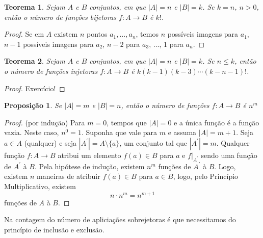 \documentclass[]{book}
\newtheorem{theorem}{Teorema}[chapter]
\newtheorem{proposition}{Proposição}[chapter]
\theoremstyle{definition}
\theoremstyle{definition}
\theoremstyle{definition}
\theoremstyle{remark}
\begin{document}
\begin{theorem}
\protect\hypertarget{thm:teoFuncoesBijetoras}{}{\label{thm:teoFuncoesBijetoras} }Sejam \(A\) e \(B\) conjuntos, em que \(|A|=n\) e \(|B|=k\).
Se \(k=n\), \(n>0\), então o número de funções bijetoras \(f:A\rightarrow B\) é \(k!\).
\end{theorem}

\begin{proof}
\iffalse{} {Prova. } \fi{}Se em \(A\) existem \(n\) pontos \(a_1, \ldots, a_n\), temos \(n\) possíveis imagens para \(a_1\), \(n-1\) possíveis imagens para \(a_2\), \(n-2\) para \(a_3\), \(\ldots\), 1 para \(a_n\).
\end{proof}

\begin{theorem}
\protect\hypertarget{thm:teoFuncoesInjetoras}{}{\label{thm:teoFuncoesInjetoras} }Sejam \(A\) e \(B\) conjuntos, em que \(|A|=n\) e \(|B|=k\).
Se \(n\leq k\), então o número de funções injetoras \(f:A\rightarrow B\) é \(k(k-1)(k-3)\cdots(k-n-1)!\).
\end{theorem}

\begin{proof}
\iffalse{} {Prova. } \fi{}Exercício!
\end{proof}

\begin{proposition}
\protect\hypertarget{prp:unnamed-chunk-85}{}{\label{prp:unnamed-chunk-85} }Se \(|A|=m\) e \(|B|=n\), então o número de funções \(f:A\rightarrow B\) é \(n^m\)
\end{proposition}

\begin{proof}
\iffalse{} {Prova. } \fi{}(por indução)
Para \(m=0\), tempos que \(|A|=0\) e a única função é a função vazia.
Neste caso, \(n^0=1\).
Suponha que vale para \(m\) e assuma \(|A|=m+1\).
Seja \(a \in A\) (qualquer) e seja \(|A^\prime|=A\setminus\{a\}\), um conjunto tal que \(|A^\prime|=m\).
Qualquer função \(f:A\rightarrow B\) atribui um elemento \(f(a)\in B\) para \(a\) e \(f|_{A^\prime}\) sendo uma função de \(A^\prime\) à \(B\).
Pela hipótese de indução, existem \(n^m\) funções de \(A^\prime\) à \(B\).
Logo, existem \(n\) maneiras de atribuir \(f(a)\in B\) para \(a \in B\), logo, pelo Princípio Multiplicativo, existem
\[n\cdot n^m = n^{m+1}\]
funções de \(A\) à \(B\).
\end{proof}

Na contagem do número de apliciações sobrejetoras é que necessitamos do princípio de inclusão e exclusão.
\end{document}
